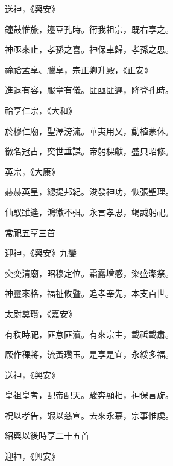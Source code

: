 \begin{pinyinscope}
 送神，《興安》



 鐘鼓惟旅，籩豆孔時。衎我祖宗，既右享之。



 神亟來止，孝孫之喜。神保聿歸，孝孫之思。



 禘祫孟享、臘享，宗正卿升殿，《正安》



 進退有容，服章有儀。匪亟匪遲，降登孔時。



 祫享仁宗，《大和》



 於穆仁廟，聖澤滂流。華夷用乂，動植蒙休。



 徽名冠古，奕世垂謀。帝躬稞獻，盛典昭修。



 英宗，《大康》



 赫赫英皇，總提邦紀。浚發神功，恢張聖理。



 仙馭雖遙，鴻徽不弭。永言孝思，竭誠躬祀。



 常祀五享三首



 迎神，《興安》九變



 奕奕清廟，昭穆定位。霜露增感，粢盛潔祭。



 神靈來格，福祉攸暨。追孝奉先，本支百世。



 太尉奠瓚，《嘉安》



 有秩時祀，匪怠匪瀆。有來宗主，載祗載肅。



 厥作稞將，流黃瓚玉。是享是宜，永綏多福。



 送神，《興安》



 皇祖皇考，配帝配天。駿奔顯相，神保言旋。



 祝以孝告，嘏以慈宣。去來永慕，宗事惟虔。



 紹興以後時享二十五首



 迎神，《興安》




\end{pinyinscope}
